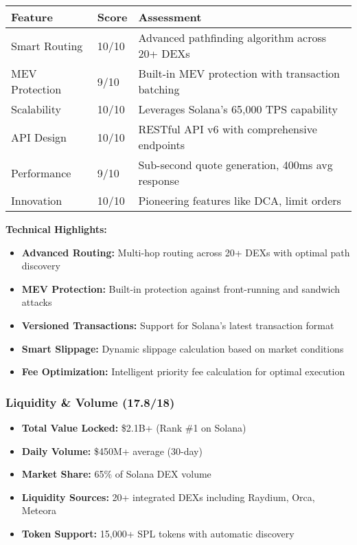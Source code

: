 \documentclass[11pt,a4paper]{article}
\begin{document}
\begin{longtable}{|p{3cm}|p{2cm}|p{8cm}|}
\hline
\textbf{Feature} & \textbf{Score} & \textbf{Assessment} \\
\hline
\endhead

Smart Routing & 10/10 & Advanced pathfinding algorithm across 20+ DEXs \\
\hline
MEV Protection & 9/10 & Built-in MEV protection with transaction batching \\
\hline
Scalability & 10/10 & Leverages Solana's 65,000 TPS capability \\
\hline
API Design & 10/10 & RESTful API v6 with comprehensive endpoints \\
\hline
Performance & 9/10 & Sub-second quote generation, 400ms avg response \\
\hline
Innovation & 10/10 & Pioneering features like DCA, limit orders \\
\hline
\end{longtable}

\textbf{Technical Highlights:}
\begin{itemize}
    \item \textbf{Advanced Routing:} Multi-hop routing across 20+ DEXs with optimal path discovery
    \item \textbf{MEV Protection:} Built-in protection against front-running and sandwich attacks
    \item \textbf{Versioned Transactions:} Support for Solana's latest transaction format
    \item \textbf{Smart Slippage:} Dynamic slippage calculation based on market conditions
    \item \textbf{Fee Optimization:} Intelligent priority fee calculation for optimal execution
\end{itemize}

\subsubsection{Liquidity \& Volume (17.8/18)}

\begin{itemize}
    \item \textbf{Total Value Locked:} \$2.1B+ (Rank \#1 on Solana)
    \item \textbf{Daily Volume:} \$450M+ average (30-day)
    \item \textbf{Market Share:} 65\% of Solana DEX volume
    \item \textbf{Liquidity Sources:} 20+ integrated DEXs including Raydium, Orca, Meteora
    \item \textbf{Token Support:} 15,000+ SPL tokens with automatic discovery
\end{itemize}
\end{document}
